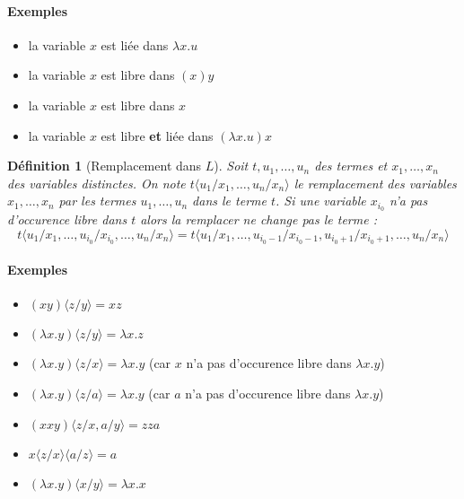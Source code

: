 \documentclass[a4paper,12pt]{article}
\theoremstyle{plain}
\newtheorem{defi}[theo]{Définition}
\begin{document}
\paragraph{Exemples}
\begin{itemize}
\setlength\itemsep{ -1.5 em}
\item la variable $x$ est liée dans $\lambda x.u$\\
\item la variable $x$ est libre dans $(x)y$ \\
\item la variable $x$ est libre dans $x$\\
\item la variable $x$ est libre \textbf{et} liée dans $(\lambda x.u) x$\\
\end{itemize}

\begin{defi}[Remplacement dans $L$]
Soit $t, u_1, \dots, u_n$ des termes et $x_1, \dots, x_n$ des variables distinctes. On note $t  \langle u_1/x_1, \dots, u_n/x_n \rangle$ le remplacement des variables $x_1, \dots, x_n$ par les termes $u_1, \dots, u_n$  dans le terme $t$. Si une variable $x_{i_0}$ n'a pas d'occurence libre dans $t$ alors la remplacer ne change pas le terme : $$t  \langle u_1/x_1, \dots, u_{i_0}/x_{i_0}, \dots, u_n/x_n \rangle = t  \langle u_1/x_1, \dots, u_{i_0 - 1}/x_{i_0 - 1}, u_{i_0 +1}/x_{i_0 + 1}, \dots, u_n/x_n \rangle $$
\end{defi}

\paragraph{Exemples}
\begin{itemize}
\setlength\itemsep{ -1.5 em}
\item $ ( xy ) \langle z/y \rangle = xz $\\
\item $ ( \lambda x.y ) \langle z/y \rangle =  \lambda x.z $ \\
\item $ ( \lambda x.y ) \langle z/x \rangle =  \lambda x.y $ (car $x$ n'a pas d'occurence libre dans $\lambda x.y $) \\
\item $ ( \lambda x.y ) \langle z/a \rangle =  \lambda x.y $ (car $a$ n'a pas d'occurence libre dans $\lambda x.y $)\\
\item $ ( xxy ) \langle z/x, a/y  \rangle = zza $ \\
\item $ x \langle z/x \rangle \langle a/z \rangle = a$\\
\item $ (\lambda x.y) \langle x/y \rangle = \lambda x . x$\\
\end{itemize}
\end{document}
